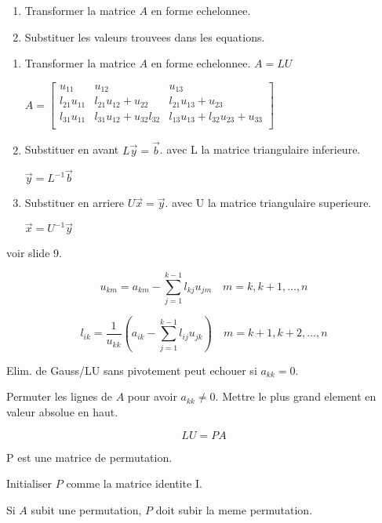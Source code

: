 \hformbar{}



\begin{enumerate}
    \item Transformer la matrice $A$ en forme echelonnee.
    \item Substituer les valeurs trouvees dans les equations.
\end{enumerate}


\begin{enumerate}
    \item Transformer la matrice $A$ en forme echelonnee. $ A = LU $

    {\hspace{-1cm}$
    A = 
    \begin{bmatrix}
        u_{11} & u_{12} & u_{13} \\
        l_{21}u_{11} & l_{21}u_{12} + u_{22} & l_{21}u_{13} + u_{23} \\
        l_{31}u_{11} & l_{31}u_{12} + u_{32}l_{32} & l_{13}u_{13} + l_{32}u_{23} + u_{33} \\
    \end{bmatrix}$}
    \item Substituer en avant $ L\vec{y} = \vec{b} $. avec L la matrice triangulaire inferieure.
    
    $\vec{y} = L^{-1} \vec{b}$

    \item Substituer en arriere $ U\vec{x} = \vec{y} $. avec U la matrice triangulaire superieure.
    
    $\vec{x} = U^{-1} \vec{y}$
\end{enumerate}

voir slide 9.


$$u_{km} = a_{km} - \sum_{j=1}^{k-1} l_{kj}u_{jm} \quad m = k, k+1, \dots, n $$

$$l_{ik} = \frac{1}{u_{kk}} \left( a_{ik} - \sum_{j=1}^{k-1} l_{ij}u_{jk} \right) \quad m = k+1, k+2, \dots, n$$


Elim. de Gauss/LU sans pivotement peut echouer si $a_{kk} = 0$.

Permuter les lignes de $A$ pour avoir $a_{kk} \neq 0$.
Mettre le plus grand element en valeur absolue en haut.

$$LU= PA$$

P est une matrice de permutation.

Initialiser $P$ comme la matrice identite I.

Si $A$ subit une permutation, $P$ doit subir la meme permutation.
